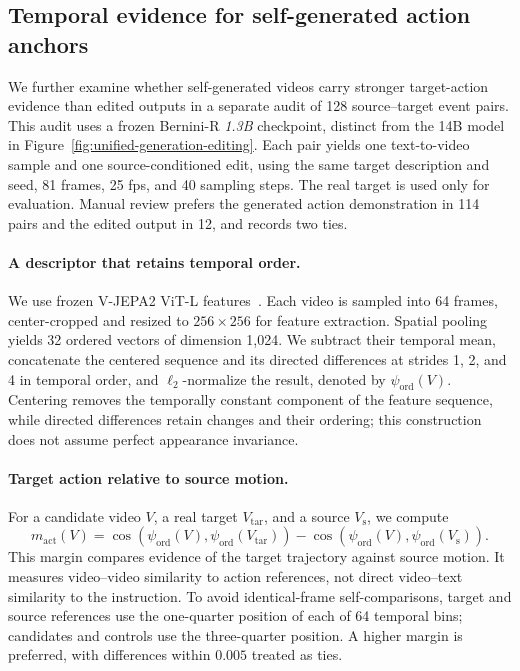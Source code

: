 \subsection{Temporal evidence for self-generated action anchors}
\label{subsec:anchor-temporal-evidence}
We further examine whether self-generated videos carry stronger target-action
evidence than edited outputs in a separate audit of 128 source--target event
pairs. This audit uses a frozen Bernini-R \emph{1.3B} checkpoint, distinct
from the 14B model in Figure~\ref{fig:unified-generation-editing}.
Each pair yields one text-to-video sample and one source-conditioned edit,
using the same target description and seed, 81 frames, 25 fps, and 40 sampling
steps. The real target is used only for evaluation. Manual review prefers
the generated action demonstration in 114 pairs and the edited output in 12,
and records two ties.

\paragraph{A descriptor that retains temporal order.}
We use frozen V-JEPA2 ViT-L features~\citep{assran2025vjepa2}. Each video is sampled into 64 frames,
center-cropped and resized to $256\!\times\!256$ for feature extraction.
Spatial pooling yields 32 ordered vectors of dimension 1,024.
We subtract their temporal mean, concatenate the centered sequence and
its directed differences at strides 1, 2, and 4 in temporal order, and
$\ell_2$-normalize the result, denoted by $\psi_{\mathrm{ord}}(V)$.
Centering removes the temporally constant component of the feature
sequence, while directed differences retain changes and their ordering;
this construction does not assume perfect appearance invariance.

\paragraph{Target action relative to source motion.}
For a candidate video $V$, a real target $V_{\mathrm{tar}}$, and a source
$V_{\mathrm{s}}$, we compute
\begin{equation}
 m_{\mathrm{act}}(V)=
 \cos\!\left(\psi_{\mathrm{ord}}(V),\psi_{\mathrm{ord}}(V_{\mathrm{tar}})\right)
 -\cos\!\left(\psi_{\mathrm{ord}}(V),\psi_{\mathrm{ord}}(V_{\mathrm{s}})\right).
 \label{eq:anchor-action-margin}
\end{equation}
This margin compares evidence of the target trajectory against source
motion. It measures video--video similarity to action references, not
direct video--text similarity to the instruction. To avoid identical-frame
self-comparisons, target and source references use the one-quarter position
of each of 64 temporal bins; candidates and controls use the three-quarter
position. A higher margin is preferred, with differences within $0.005$
treated as ties.

